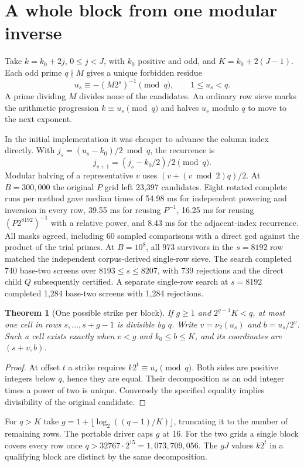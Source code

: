 \documentclass[11pt,a4paper,oneside,openany]{report}
\newtheorem{theorem}{Theorem}[chapter]
\begin{document}
\section{A whole block from one modular inverse}
Take $k=k_0+2j$, $0\le j<J$, with $k_0$ positive and odd, and $K=k_0+2(J-1)$. Each odd prime $q\nmid M$ gives a unique forbidden residue
\[
  u_s\equiv-(M2^s)^{-1}\pmod q,\qquad 1\le u_s<q .
\]
A prime dividing $M$ divides none of the candidates. An ordinary row sieve marks the arithmetic progression $k\equiv u_s\pmod q$ and halves $u_s$ modulo $q$ to move to the next exponent.

In the initial implementation it was cheaper to advance the column index directly. With $j_s=(u_s-k_0)/2\bmod q$, the recurrence is
\[
  j_{s+1}=(j_s-k_0/2)/2\pmod q.
\]
Modular halving of a representative $v$ uses $(v+(v\bmod 2)q)/2$. At $B=300{,}000$ the original $P$ grid left 23,397 candidates. Eight rotated complete runs per method gave median times of 54.98 ms for independent powering and inversion in every row, 39.55 ms for reusing $P^{-1}$, 16.25 ms for reusing $(P2^{8192})^{-1}$ with a relative power, and 8.43 ms for the adjacent-index recurrence. All masks agreed, including 60 sampled comparisons with a direct gcd against the product of the trial primes. At $B=10^8$, all 973 survivors in the $s=8192$ row matched the independent corpus-derived single-row sieve. The search completed 740 base-two screens over $8193\le s\le8207$, with 739 rejections and the direct child $Q$ subsequently certified. A separate single-row search at $s=8192$ completed 1,284 base-two screens with 1,284 rejections.

\begin{theorem}[One possible strike per block]\label{th:block}
If $g\ge1$ and $2^{g-1}K<q$, at most one cell in rows $s,\ldots,s+g-1$ is divisible by $q$. Write $v=\nu_2(u_s)$ and $b=u_s/2^v$. Such a cell exists exactly when $v<g$ and $k_0\le b\le K$, and its coordinates are $(s+v,b)$.
\end{theorem}
\begin{proof}
At offset $t$ a strike requires $k2^t\equiv u_s\pmod q$. Both sides are positive integers below $q$, hence they are equal. Their decomposition as an odd integer times a power of two is unique. Conversely the specified equality implies divisibility of the original candidate.
\end{proof}

For $q>K$ take $g=1+\lfloor\log_2((q-1)/K)\rfloor$, truncating it to the number of remaining rows. The portable driver caps $g$ at 16. For the two grids a single block covers every row once $q>32767\cdot2^{15}=1{,}073{,}709{,}056$. The $gJ$ values $k2^t$ in a qualifying block are distinct by the same decomposition.
\end{document}
